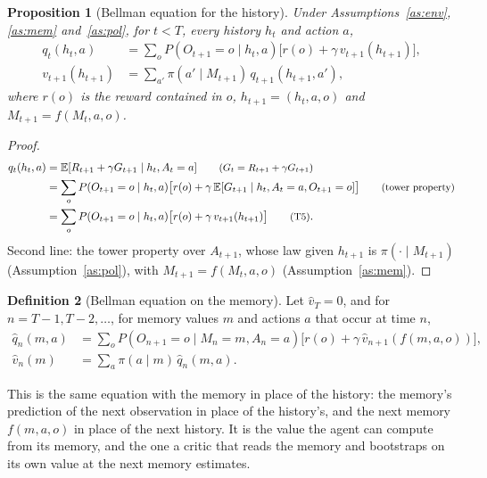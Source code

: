 \documentclass{article}
\newtheorem{proposition}{Proposition}[section]
\theoremstyle{definition}
\newtheorem{definition}[proposition]{Definition}
\theoremstyle{remark}
\newcommand{\E}{\mathbb{E}}
\newcommand{\why}[1]{\tag*{\small(#1)}}
\begin{document}
\begin{proposition}[Bellman equation for the history]\label{prop:bellman-h}
Under Assumptions~\ref{as:env}, \ref{as:mem} and~\ref{as:pol}, for $t<T$, every history $h_t$ and action $a$,
\begin{align*}
q_t(h_t,a)&=\sum_oP(O_{t+1}=o\mid h_t,a)\big[r(o)+\gamma\,v_{t+1}(h_{t+1})\big],\\
v_{t+1}(h_{t+1})&=\sum_{a'}\pi(a'\mid M_{t+1})\,q_{t+1}(h_{t+1},a'),
\end{align*}
where $r(o)$ is the reward contained in $o$, $h_{t+1}=(h_t,a,o)$ and $M_{t+1}=f(M_t,a,o)$.
\end{proposition}

\begin{proof}
\begin{align*}
q_t(h_t,a)&=\E[R_{t+1}+\gamma G_{t+1}\mid h_t,A_t=a] \why{$G_t=R_{t+1}+\gamma G_{t+1}$}\\
&=\sum_oP(O_{t+1}=o\mid h_t,a)\big[r(o)+\gamma\,\E[G_{t+1}\mid h_t,A_t=a,O_{t+1}=o]\big] \why{tower property}\\
&=\sum_oP(O_{t+1}=o\mid h_t,a)\big[r(o)+\gamma\,v_{t+1}(h_{t+1})\big] \why{T5}.
\end{align*}
Second line: the tower property over $A_{t+1}$, whose law given $h_{t+1}$ is $\pi(\cdot\mid M_{t+1})$ (Assumption~\ref{as:pol}), with $M_{t+1}=f(M_t,a,o)$ (Assumption~\ref{as:mem}).
\end{proof}

\begin{definition}[Bellman equation on the memory]\label{def:bellman-m}
Let $\hat v_T=0$, and for $n=T-1,T-2,\dots$, for memory values $m$ and actions $a$ that occur at time $n$,
\begin{align*}
\hat q_n(m,a)&=\sum_oP(O_{n+1}=o\mid M_n=m,A_n=a)\big[r(o)+\gamma\,\hat v_{n+1}(f(m,a,o))\big],\\
\hat v_n(m)&=\sum_a\pi(a\mid m)\,\hat q_n(m,a).
\end{align*}
\end{definition}

This is the same equation with the memory in place of the history: the memory's prediction of the next observation in place of the history's, and the next memory $f(m,a,o)$ in place of the next history. It is the value the agent can compute from its memory, and the one a critic that reads the memory and bootstraps on its own value at the next memory estimates.
\end{document}
